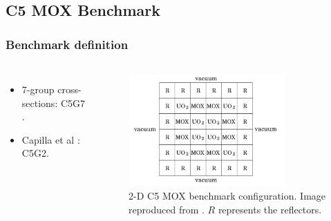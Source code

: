 \subsection{C5 MOX Benchmark}
\begin{frame}
\frametitle{Benchmark definition}

\begin{columns}
    \column[t]{4cm}
    \begin{itemize}
        \item 7-group cross-sections: C5G7 \cite{oecdnea_benchmark_2003}.
        \item Capilla et al \cite{capilla_applications_2009}: C5G2.
    \end{itemize}

    \column[t]{6cm}
    \begin{figure}[htbp!]
        \begin{center}
            \includegraphics[width=6cm]{../C5G2-benchmark/bench-config}
        \end{center}
        \caption{2-D C5 MOX benchmark configuration. Image reproduced from \cite{capilla_applications_2009}. $R$ represents the reflectors.}
    \end{figure}
\end{columns}
\end{frame}


